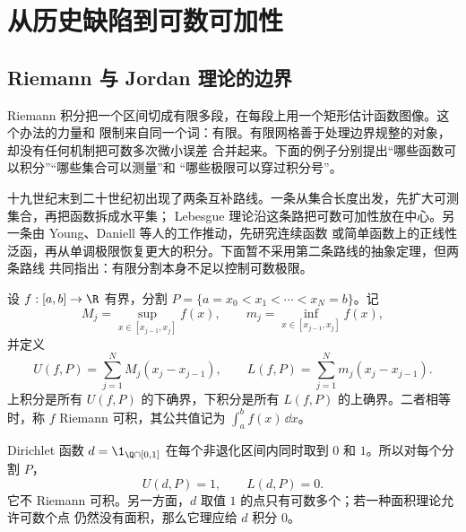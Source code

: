 \section{从历史缺陷到可数可加性}\label{sec:02-01}

\subsection{Riemann 与 Jordan 理论的边界}\label{subsec:2-1-1}

Riemann 积分把一个区间切成有限多段，在每段上用一个矩形估计函数图像。这个办法的力量和
限制来自同一个词：有限。有限网格善于处理边界规整的对象，却没有任何机制把可数多次微小误差
合并起来。下面的例子分别提出“哪些函数可以积分”“哪些集合可以测量”和
“哪些极限可以穿过积分号”。

十九世纪末到二十世纪初出现了两条互补路线。一条从集合长度出发，先扩大可测集合，再把函数拆成水平集；
Lebesgue 理论沿这条路把可数可加性放在中心。另一条由 Young、Daniell 等人的工作推动，先研究连续函数
或简单函数上的正线性泛函，再从单调极限恢复更大的积分。下面暂不采用第二条路线的抽象定理，但两条路线
共同指出：有限分割本身不足以控制可数极限。

\begin{definition}\label{def:2-1-1-1}
设 $f:[a,b]\to\R$ 有界，分割
$P=\{a=x_0<x_1<\cdots <x_N=b\}$。记
\[
 M_j=\sup_{x\in[x_{j-1},x_j]}f(x),\qquad
 m_j=\inf_{x\in[x_{j-1},x_j]}f(x),
\]
并定义
\[
 U(f,P)=\sum_{j=1}^N M_j(x_j-x_{j-1}),\qquad
 L(f,P)=\sum_{j=1}^N m_j(x_j-x_{j-1}).
\]
上积分是所有 $U(f,P)$ 的下确界，下积分是所有 $L(f,P)$ 的上确界。二者相等时，称
$f$ Riemann 可积，其公共值记为 $\int_a^b f(x)\,\dd x$。
\end{definition}

\begin{example}[Dirichlet 函数]\label{ex:2-1-1-1}
Dirichlet 函数 $d=\1_{\Q\cap[0,1]}$ 在每个非退化区间内同时取到 $0$ 和 $1$。所以对每个分割
$P$，
\[
 U(d,P)=1,\qquad L(d,P)=0.
\]
它不 Riemann 可积。另一方面，$d$ 取值 $1$ 的点只有可数多个；若一种面积理论允许可数个点
仍然没有面积，那么它理应给 $d$ 积分 $0$。
\end{example}

